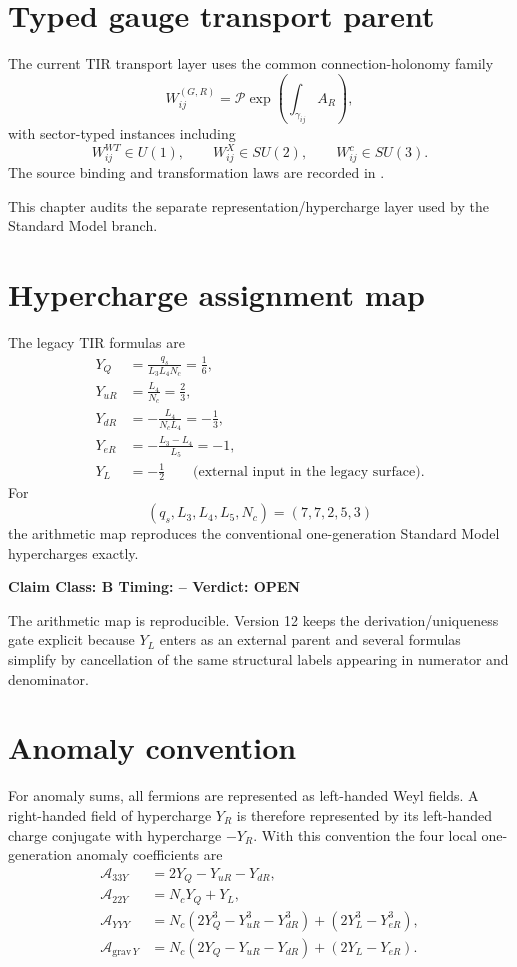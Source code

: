 \documentclass[11pt,a4paper,twoside]{book}
\theoremstyle{definition}
\newcommand{\vTwelveStatus}[3]{\par\noindent\textbf{Claim Class: #1 \quad Timing: #2 \quad Verdict: #3}\par}
\begin{document}
\section{Typed gauge transport parent}

The current TIR transport layer uses the common connection-holonomy family
\[
W_{ij}^{(G,R)}
=\mathcal P\exp\!\left(\int_{\gamma_{ij}}A_R\right),
\]
with sector-typed instances including
\[
W_{ij}^{WT}\in U(1),
\qquad
W_{ij}^{X}\in SU(2),
\qquad
W_{ij}^{c}\in SU(3).
\]
The source binding and transformation laws are recorded in
.

This chapter audits the separate representation/hypercharge layer used by the Standard Model branch.

\section{Hypercharge assignment map}

The legacy TIR formulas are
\begin{align}
Y_Q&=\frac{q_s}{L_3L_4N_c}=\frac16,\\
Y_{uR}&=\frac{L_4}{N_c}=\frac23,\\
Y_{dR}&=-\frac{L_4}{N_cL_4}=-\frac13,\\
Y_{eR}&=-\frac{L_3-L_4}{L_5}=-1,\\
Y_L&=-\frac12\qquad\text{(external input in the legacy surface)}.
\end{align}
For
\[
(q_s,L_3,L_4,L_5,N_c)=(7,7,2,5,3)
\]
the arithmetic map reproduces the conventional one-generation Standard Model hypercharges exactly.

\vTwelveStatus{B}{--}{OPEN}
The arithmetic map is reproducible. Version 12 keeps the derivation/uniqueness gate explicit because $Y_L$ enters as an external parent and several formulas simplify by cancellation of the same structural labels appearing in numerator and denominator.

\section{Anomaly convention}

For anomaly sums, all fermions are represented as left-handed Weyl fields. A right-handed field of hypercharge $Y_R$ is therefore represented by its left-handed charge conjugate with hypercharge $-Y_R$. With this convention the four local one-generation anomaly coefficients are
\begin{align}
\mathcal A_{33Y}
&=2Y_Q-Y_{uR}-Y_{dR},\\
\mathcal A_{22Y}
&=N_cY_Q+Y_L,\\
\mathcal A_{YYY}
&=N_c\left(2Y_Q^3-Y_{uR}^3-Y_{dR}^3\right)
 +\left(2Y_L^3-Y_{eR}^3\right),\\
\mathcal A_{\mathrm{grav}\,Y}
&=N_c\left(2Y_Q-Y_{uR}-Y_{dR}\right)
 +\left(2Y_L-Y_{eR}\right).
\end{align}
\end{document}
